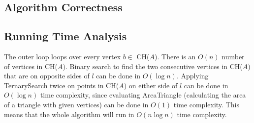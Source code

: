 \documentclass[a4paper]{article}
\begin{document}
    \subsection*{Algorithm Correctness}


    \subsection*{Running Time Analysis}
    The outer loop loops over every vertex $b \in$ CH($A$).
    There is an $O(n)$ number of vertices in CH($A$). 
    Binary search to find the two consecutive vertices in CH($A$) that are on opposite sides of $l$ can be done in $O(\log n)$.
    Applying TernarySearch twice on points in CH($A$) on either side of $l$ can be done in $O(\log n)$ time complexity, since evaluating AreaTriangle (calculating the area of a triangle with given vertices) can be done in  $O(1)$ time complexity.
    This means that the whole algorithm will run in $O(n\log n)$ time complexity.
\end{document}
